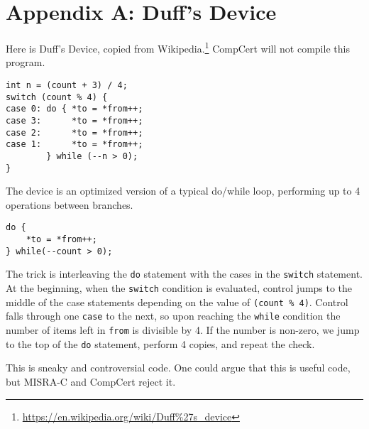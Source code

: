 \section*{Appendix A: Duff's Device}
\label{app:A}

Here is Duff's Device, copied from Wikipedia.\footnote{\url{https://en.wikipedia.org/wiki/Duff\%27s\_device}}
CompCert will not compile this program.

\begin{lstlisting}
int n = (count + 3) / 4;
switch (count % 4) {
case 0: do { *to = *from++;
case 3:      *to = *from++;
case 2:      *to = *from++;
case 1:      *to = *from++;
        } while (--n > 0);
}
\end{lstlisting}

The device is an optimized version of a typical do/while loop, performing up to 4 operations between branches.

\begin{lstlisting}
do {
    *to = *from++;
} while(--count > 0);
\end{lstlisting}

The trick is interleaving the \lstinline{do} statement with the cases in the \lstinline{switch} statement.
At the beginning, when the \lstinline{switch} condition is evaluated, control jumps to the middle of the case statements depending on the value of \lstinline{(count % 4)}.
Control falls through one \lstinline{case} to the next, so upon reaching the \lstinline{while} condition the number of items left in \lstinline{from} is divisible by 4.
If the number is non-zero, we jump to the top of the \lstinline{do} statement, perform 4 copies, and repeat the check.

This is sneaky and controversial code.
One could argue that this is useful code, but MISRA-C and CompCert reject it.

